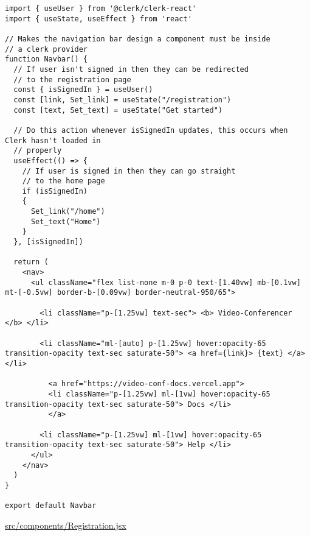 \begin{verbatim}
import { useUser } from '@clerk/clerk-react'
import { useState, useEffect } from 'react'

// Makes the navigation bar design a component must be inside
// a clerk provider
function Navbar() {
  // If user isn't signed in then they can be redirected
  // to the registration page
  const { isSignedIn } = useUser()
  const [link, Set_link] = useState("/registration")
  const [text, Set_text] = useState("Get started")

  // Do this action whenever isSignedIn updates, this occurs when Clerk hasn't loaded in
  // properly
  useEffect(() => {
    // If user is signed in then they can go straight
    // to the home page
    if (isSignedIn)
    {
      Set_link("/home")
      Set_text("Home")
    }
  }, [isSignedIn])

  return (
    <nav>
      <ul className="flex list-none m-0 p-0 text-[1.40vw] mb-[0.1vw] mt-[-0.5vw] border-b-[0.09vw] border-neutral-950/65">

        <li className="p-[1.25vw] text-sec"> <b> Video-Conferencer </b> </li>

        <li className="ml-[auto] p-[1.25vw] hover:opacity-65 transition-opacity text-sec saturate-50"> <a href={link}> {text} </a> </li>

	      <a href="https://video-conf-docs.vercel.app">
          <li className="p-[1.25vw] ml-[1vw] hover:opacity-65 transition-opacity text-sec saturate-50"> Docs </li>
		  </a>

        <li className="p-[1.25vw] ml-[1vw] hover:opacity-65 transition-opacity text-sec saturate-50"> Help </li>
      </ul>
    </nav>
  )
}

export default Navbar
\end{verbatim}

\underline{src/components/Registration.jsx}

